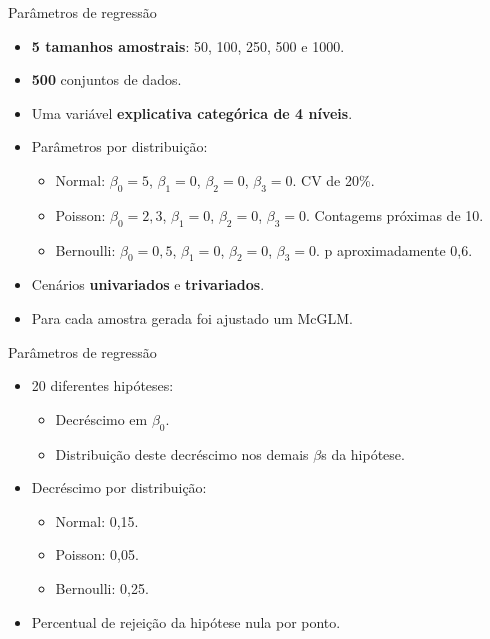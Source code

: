 \documentclass[
  ignorenonframetext,
  serif,
  professionalfont,
  usenames,
  dvipsnames,
  aspectratio = 169]{beamer}
\begin{document}
\begin{frame}{Parâmetros de regressão}
\protect\hypertarget{paruxe2metros-de-regressuxe3o}{}
\begin{itemize}
  \itemsep 2ex
    
  \item \textbf{5 tamanhos amostrais}: 50, 100, 250, 500 e  1000.

  \item \textbf{500} conjuntos de dados.

  \item Uma variável \textbf{explicativa categórica de 4 níveis}.

  \item Parâmetros por distribuição:
    \begin{itemize}
        \item Normal: $\beta_0 = 5$, $\beta_1 = 0$, $\beta_2 = 0$, $\beta_3 = 0$. CV de 20\%.
        \item Poisson: $\beta_0 = 2,3$, $\beta_1 = 0$, $\beta_2 = 0$, $\beta_3 = 0$. Contagems próximas de 10.
        \item Bernoulli: $\beta_0 = 0,5$, $\beta_1 = 0$, $\beta_2 = 0$, $\beta_3 = 0$. p aproximadamente 0,6.
        \end{itemize}
      
  \item Cenários \textbf{univariados} e \textbf{trivariados}.

  \item Para cada amostra gerada foi ajustado um McGLM.

\end{itemize}
\end{frame}

\begin{frame}{Parâmetros de regressão}
\protect\hypertarget{paruxe2metros-de-regressuxe3o-1}{}
\begin{itemize}
  \itemsep 2ex

  \item 20 diferentes hipóteses:
    \begin{itemize}
      \item Decréscimo em $\beta_0$.
      \item Distribuição deste decréscimo nos demais $\beta$s da hipótese.
    \end{itemize}

  \item Decréscimo por distribuição:
    \begin{itemize}
        \item Normal: 0,15.
        \item Poisson: 0,05.
        \item Bernoulli: 0,25. 
       \end{itemize}

  \item Percentual de rejeição da hipótese nula por ponto. 

\end{itemize}
\end{frame}
\end{document}
